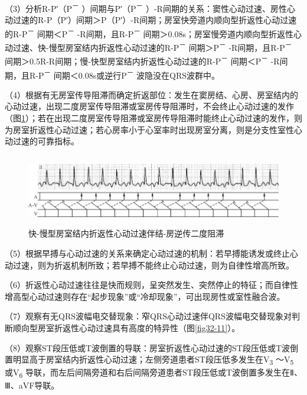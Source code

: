 （3）分析R-P′（P\textsuperscript{－} ）间期与P′（P\textsuperscript{－}
）-R间期的关系：窦性心动过速、房性心动过速的R-P（P′）间期＞P（P′）-R间期；房室快旁道内顺向型折返性心动过速的R-P\textsuperscript{－}
间期＜P\textsuperscript{－} -R间期，且R-P\textsuperscript{－}
间期＞0.08s；房室慢旁道内顺向型折返性心动过速、快-慢型房室结内折返性心动过速的R-P\textsuperscript{－}
间期＞P\textsuperscript{－} -R间期，且R-P\textsuperscript{－}
间期＞0.5R-R间期；慢-快型房室结内折返性心动过速的R-P\textsuperscript{－}
间期＜P\textsuperscript{－} -R间期，且R-P\textsuperscript{－}
间期＜0.08s或逆行P\textsuperscript{－} 波隐没在QRS波群中。

（4）根据有无房室传导阻滞而确定折返部位：发生在窦房结、心房、房室结内的心动过速，出现二度房室传导阻滞或室房传导阻滞时，不会终止心动过速的发作（图\ref{fig32-13}）；若在出现二度房室传导阻滞或室房传导阻滞时能终止心动过速的发作，则为房室折返性心动过速；若心房率小于心室率时出现房室分离，则是分支性室性心动过速的可靠指标。

\begin{figure}[!htbp]
 \centering
 \includegraphics[width=5.80208in,height=1.22917in]{./images/Image00529.jpg}
 \captionsetup{justification=centering}
 \caption{快-慢型房室结内折返性心动过速伴结-房逆传二度阻滞}
 \label{fig32-13}
  \end{figure} 

（5）根据早搏与心动过速的关系来确定心动过速的机制：若早搏能诱发或终止心动过速，则为折返机制所致；若早搏不能终止心动过速，则为自律性增高所致。

（6）折返性心动过速往往是快而规则，呈突然发生、突然停止的特征；而自律性增高型心动过速则存在“起步现象”或“冷却现象”，可出现房性或室性融合波。

（7）观察有无QRS波幅电交替现象：窄QRS心动过速伴QRS波幅电交替现象对判断顺向型房室折返性心动过速具有高度的特异性（图\ref{fig32-11}）。

（8）观察ST段压低或T波倒置的导联：房室折返性心动过速的ST段压低或T波倒置明显高于房室结内折返性心动过速；左侧旁道患者ST段压低多发生在V\textsubscript{3}
～V\textsubscript{5} 或V\textsubscript{6}
导联，而左后间隔旁道和右后间隔旁道患者ST段压低或T波倒置多发生在Ⅱ、Ⅲ、aVF导联。

\protect\hypertarget{text00040.html}{}{}

